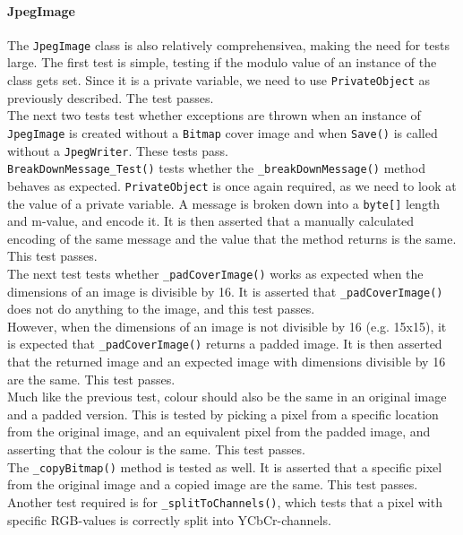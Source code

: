 \paragraph*{JpegImage}
The \lstinline|JpegImage| class is also relatively comprehensivea, making the need for tests large.
The first test is simple, testing if the modulo value of an instance of the class gets set.
Since it is a private variable, we need to use \lstinline|PrivateObject| as previously described.
The test passes.\\
The next two tests test whether exceptions are thrown when an instance of \lstinline|JpegImage| is created without a \lstinline|Bitmap| cover image and when \lstinline|Save()| is called without a \lstinline|JpegWriter|.
These tests pass.\\
\lstinline|BreakDownMessage_Test()| tests whether the \lstinline|_breakDownMessage()| method behaves as expected.
\lstinline|PrivateObject| is once again required, as we need to look at the value of a private variable.
A message is broken down into a \lstinline|byte[]| length and m-value, and encode it.
It is then asserted that a manually calculated encoding of the same message and the value that the method returns is the same.
This test passes.\\
The next test tests whether \lstinline|_padCoverImage()| works as expected when the dimensions of an image is divisible by 16.
It is asserted that \lstinline|_padCoverImage()| does not do anything to the image, and this test passes.\\
However, when the dimensions of an image is not divisible by 16 (e.g. 15x15), it is expected that \lstinline|_padCoverImage()| returns a padded image.
It is then asserted that the returned image and an expected image with dimensions divisible by 16 are the same.
This test passes.\\
Much like the previous test, colour should also be the same in an original image and a padded version.
This is tested by picking a pixel from a specific location from the original image, and an equivalent pixel from the padded image, and asserting that the colour is the same.
This test passes.\\
The \lstinline|_copyBitmap()| method is tested as well.
It is asserted that a specific pixel from the original image and a copied image are the same.
This test passes.\\
Another test required is for \lstinline|_splitToChannels()|, which tests that a pixel with specific RGB-values is correctly split into YCbCr-channels.
